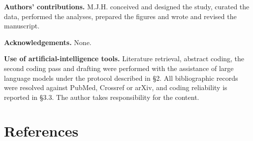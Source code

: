 \documentclass[11pt]{article}
\begin{document}
\textbf{Authors' contributions.} M.J.H. conceived and designed the
study, curated the data, performed the analyses, prepared the figures
and wrote and revised the manuscript.

\textbf{Acknowledgements.} None.

\textbf{Use of artificial-intelligence tools.} Literature retrieval,
abstract coding, the second coding pass and drafting were performed with
the assistance of large language models under the protocol described in
§2. All bibliographic records were resolved against PubMed, Crossref or
arXiv, and coding reliability is reported in §3.3. The author takes
responsibility for the content.

\clearpage
\section{References}\label{references}
\end{document}
